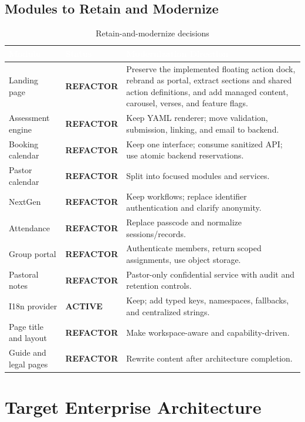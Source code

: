\documentclass[11pt,a4paper,oneside]{report}
\newcommand{\statusactive}{\textcolor{notegreen}{\textbf{ACTIVE}}}
\newcommand{\statusrefactor}{\textcolor{accent!80!black}{\textbf{REFACTOR}}}
\begin{document}
\section{Modules to Retain and Modernize}

\begin{table}[H]
\centering
{}
\begin{tabularx}{\linewidth}{@{}l l X@{}}
\toprule
\rowcolor{primary}
\textcolor{white}{\textbf{Module}} & \textcolor{white}{\textbf{Status}} & \textcolor{white}{\textbf{Modernization Direction}} \\
\midrule
Landing page & \statusrefactor & Preserve the implemented floating action dock, rebrand as portal, extract sections and shared action definitions, and add managed content, carousel, verses, and feature flags. \\
Assessment engine & \statusrefactor & Keep YAML renderer; move validation, submission, linking, and email to backend. \\
Booking calendar & \statusrefactor & Keep one interface; consume sanitized API; use atomic backend reservations. \\
Pastor calendar & \statusrefactor & Split into focused modules and services. \\
NextGen & \statusrefactor & Keep workflows; replace identifier authentication and clarify anonymity. \\
Attendance & \statusrefactor & Replace passcode and normalize sessions/records. \\
Group portal & \statusrefactor & Authenticate members, return scoped assignments, use object storage. \\
Pastoral notes & \statusrefactor & Pastor-only confidential service with audit and retention controls. \\
I18n provider & \statusactive & Keep; add typed keys, namespaces, fallbacks, and centralized strings. \\
Page title and layout & \statusrefactor & Make workspace-aware and capability-driven. \\
Guide and legal pages & \statusrefactor & Rewrite content after architecture completion. \\
\bottomrule
\end{tabularx}
\caption{Retain-and-modernize decisions}
\end{table}

\chapter{Target Enterprise Architecture}
\end{document}
